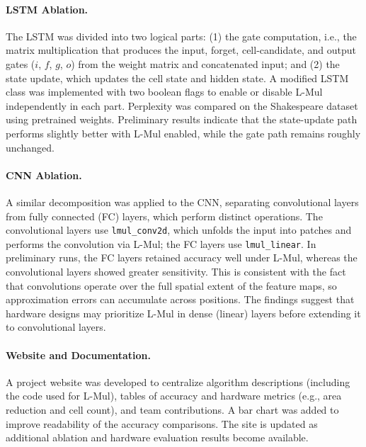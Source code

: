 \documentclass[12pt,letterpaper]{article}
\begin{document}
\paragraph{LSTM Ablation.} The LSTM was divided into two logical parts: (1) the gate computation, i.e., the matrix multiplication that produces the input, forget, cell-candidate, and output gates ($i$, $f$, $g$, $o$) from the weight matrix and concatenated input; and (2) the state update, which updates the cell state and hidden state. A modified LSTM class was implemented with two boolean flags to enable or disable L-Mul independently in each part. Perplexity was compared on the Shakespeare dataset using pretrained weights. Preliminary results indicate that the state-update path performs slightly better with L-Mul enabled, while the gate path remains roughly unchanged.

\paragraph{CNN Ablation.} A similar decomposition was applied to the CNN, separating convolutional layers from fully connected (FC) layers, which perform distinct operations. The convolutional layers use \texttt{lmul\_conv2d}, which unfolds the input into patches and performs the convolution via L-Mul; the FC layers use \texttt{lmul\_linear}. In preliminary runs, the FC layers retained accuracy well under L-Mul, whereas the convolutional layers showed greater sensitivity. This is consistent with the fact that convolutions operate over the full spatial extent of the feature maps, so approximation errors can accumulate across positions. The findings suggest that hardware designs may prioritize L-Mul in dense (linear) layers before extending it to convolutional layers.

\paragraph{Website and Documentation.} A project website was developed to centralize algorithm descriptions (including the code used for L-Mul), tables of accuracy and hardware metrics (e.g., area reduction and cell count), and team contributions. A bar chart was added to improve readability of the accuracy comparisons. The site is updated as additional ablation and hardware evaluation results become available.

\end{document}
